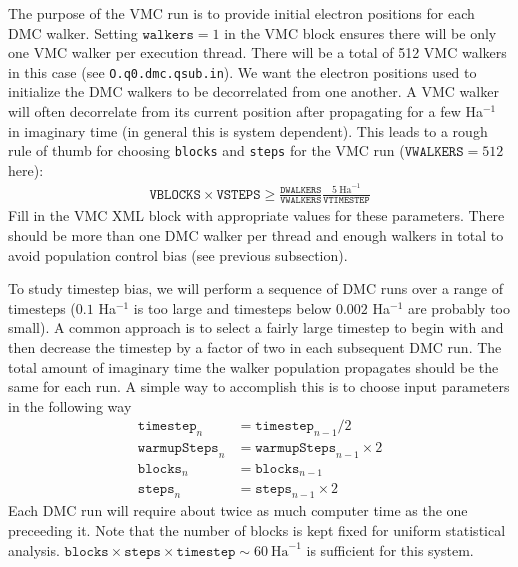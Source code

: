 The purpose of the VMC run is to provide initial electron positions for each DMC walker.  Setting $\texttt{walkers}=1$ in the VMC block ensures there will be only one VMC walker per execution thread.  There will be a total of 512 VMC walkers in this case (see \texttt{O.q0.dmc.qsub.in}).  We want the electron positions used to initialize the DMC walkers to be decorrelated from one another.  A VMC walker will often decorrelate from its current position after propagating for a few Ha$^{-1}$ in imaginary time (in general this is system dependent).  This leads to a rough rule of thumb for choosing \texttt{blocks} and \texttt{steps} for the VMC run ($\texttt{VWALKERS}=512$ here):
\begin{align}
  \texttt{VBLOCKS}\times\texttt{VSTEPS} \ge \frac{\texttt{DWALKERS}}{\texttt{VWALKERS}} \frac{5~\textrm{Ha}^{-1}}{\texttt{VTIMESTEP}}
\end{align}
Fill in the VMC XML block with appropriate values for these parameters.  There should be more than one DMC walker per thread and enough walkers in total to avoid population control bias (see previous subsection).

To study timestep bias, we will perform a sequence of DMC runs over a range of timesteps ($0.1$ Ha$^{-1}$ is too large and timesteps below $0.002$ Ha$^{-1}$ are probably too small).  A common approach is to select a fairly large timestep to begin with and then decrease the timestep by a factor of two in each subsequent DMC run.  The total amount of imaginary time the walker population propagates should be the same for each run.  A simple way to accomplish this is to choose input parameters in the following way
\begin{align}\label{eq:timestep_iter}
  \texttt{timestep}_{n}    &= \texttt{timestep}_{n-1}/2\nonumber\\
  \texttt{warmupSteps}_{n} &= \texttt{warmupSteps}_{n-1}\times 2\nonumber\\
  \texttt{blocks}_{n}      &= \texttt{blocks}_{n-1}\nonumber\\
  \texttt{steps}_{n}       &= \texttt{steps}_{n-1}\times 2
\end{align}
Each DMC run will require about twice as much computer time as the one preceeding it.  Note that the number of blocks is kept fixed for uniform statistical analysis.  $\texttt{blocks}\times\texttt{steps}\times\texttt{timestep}\sim 60~\mathrm{Ha}^{-1}$ is sufficient for this system.

